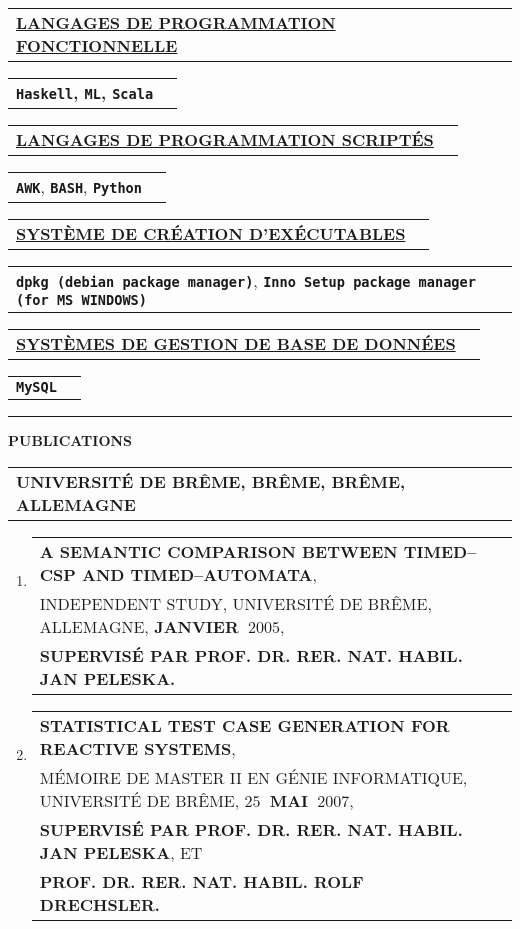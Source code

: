 \documentclass[9pt,a4paper]{article} %
\makeatletter
\newcommand{\headerrow}[2]
{\begin{tabular*}{\linewidth}{l@{\extracolsep{\fill}}r}
	#1 &
	#2 \\
\end{tabular*}}
\newcommand{\headerrowONE}[1]{\headerrow{#1}{}}
\newcommand{\dpkgmanager}{\texttt{dpkg (debian package manager)}\xspace}
\newcommand{\innosetuppackagemanager}{\texttt{Inno Setup package manager (for MS~WINDOWS)}\xspace}
\newcommand{\AWK}{\texttt{AWK}\xspace}
\newcommand{\bash}{\texttt{BASH}\xspace}
\newcommand{\python}{\texttt{Python}\xspace}
\newcommand{\scala}{\texttt{Scala}\xspace}
\newcommand{\haskell}{\texttt{Haskell}\xspace}
\newcommand{\ml}{\texttt{ML}\xspace}
\newcommand{\mysql}{\texttt{MySQL}\xspace}
\makeatother
\begin{document}
\headerrowONE{\textbf{\underline{LANGAGES DE PROGRAMMATION FONCTIONNELLE}}}
\headerrowONE{\textbf{\textbf{\haskell}, \textbf{\ml}, \scala}}

\vspace{0.3em}

\headerrowONE{\textbf{\underline{LANGAGES DE PROGRAMMATION SCRIPTÉS}}}
\headerrowONE{\textbf{\AWK}, \textbf{\bash}, \textbf{\python}}

\vspace{0.3em}

\headerrowONE{\textbf{\underline{SYSTÈME DE CRÉATION D'EXÉCUTABLES}}}
\headerrowONE{\textbf{\dpkgmanager}, \textbf{\innosetuppackagemanager}}

\vspace{0.3em}

\headerrowONE{\textbf{\underline{SYSTÈMES DE GESTION DE BASE DE DONNÉES}}}
\headerrowONE{\textbf{\mysql}}


\vspace{1em}

\hrule
\begin{center}
{\large \textbf{PUBLICATIONS}}
\end{center}

\vspace{0.5em}

\headerrowONE{\textbf{UNIVERSITÉ DE BRÊME, BRÊME, BRÊME, ALLEMAGNE}}

\vspace{0.3em}

\begin{enumerate}
\item \headerrowONE{\textbf{A SEMANTIC COMPARISON BETWEEN TIMED--CSP AND TIMED--AUTOMATA},\\
	INDEPENDENT STUDY, UNIVERSITÉ DE BRÊME, ALLEMAGNE, \textbf{JANVIER~$2005$},\\
	\textbf{SUPERVISÉ PAR PROF. DR. RER. NAT. HABIL. JAN PELESKA.}}
 
\item \headerrowONE{\textbf{STATISTICAL TEST CASE GENERATION FOR REACTIVE SYSTEMS},\\
	MÉMOIRE DE MASTER II EN GÉNIE INFORMATIQUE, UNIVERSITÉ DE BRÊME, \textbf{$25$~MAI~$2007$},\\
	\textbf{SUPERVISÉ PAR PROF. DR. RER. NAT. HABIL. JAN PELESKA}, ET\\
	\textbf{PROF. DR. RER. NAT. HABIL. ROLF DRECHSLER.}}
\end{enumerate}
\end{document}

